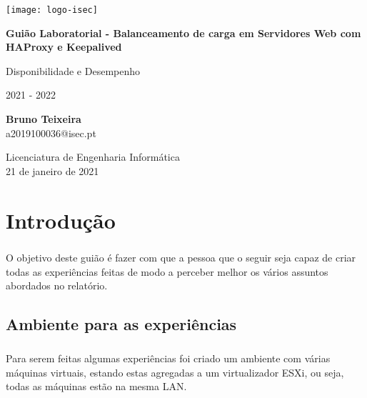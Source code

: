 \documentclass{report}
\begin{document}
	\begin{titlepage}
    	\begin{center}
    		\texttt{[image: logo-isec]}
    		
    		\vspace*{\fill}
    		
    		\Huge
    		\textbf{Guião Laboratorial - Balanceamento de carga em Servidores Web com HAProxy e Keepalived}
    		
    		\huge
    		Disponibilidade e Desempenho
    		
    		\vspace{0.5cm}
    		\LARGE
    		2021 - 2022
    		
    		\vspace{1.5cm}
    		
    		\textbf{Bruno Teixeira}\\
                a2019100036@isec.pt
    		
    		\vfill
    		\vspace*{\fill}
    		
    		\normalsize
    		Licenciatura de Engenharia Informática \\
    		21 de janeiro de 2021
    	\end{center}
    \end{titlepage}



\tableofcontents
\listoffigures    %


\clearpage
{}


\chapter{Introdução}\label{chap.introducao}
\paragraph{}
O objetivo deste guião é fazer com que a pessoa que o seguir seja capaz de criar todas as experiências feitas de modo a perceber melhor os vários assuntos abordados no relatório.

\section{Ambiente para as experiências}
\paragraph{}
Para serem feitas algumas experiências foi criado um ambiente com várias máquinas virtuais, estando estas agregadas a um virtualizador ESXi, ou seja, todas as máquinas estão na mesma LAN.
\end{document}
